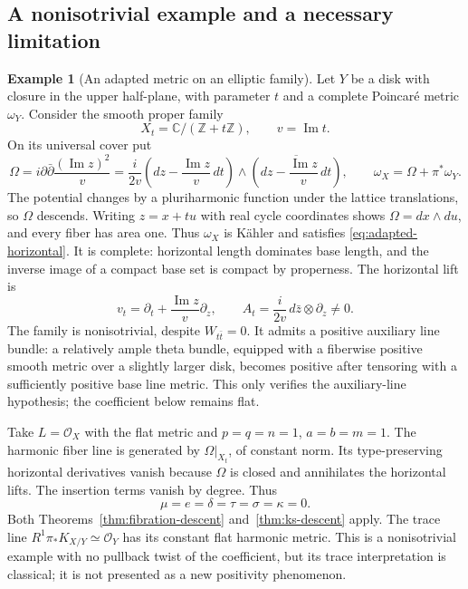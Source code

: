 \documentclass[11pt,reqno]{amsart}
\numberwithin{equation}{section}
\theoremstyle{definition}
\newtheorem{example}[theorem]{Example}
\theoremstyle{remark}
\newcommand{\ddbar}{\partial\bar\partial}
\newcommand{\C}{\mathbb C}
\newcommand{\cO}{\mathcal O}
\begin{document}
\subsection{A nonisotrivial example and a necessary limitation}
\begin{example}[An adapted metric on an elliptic family]\label{ex:elliptic-fibration}
Let $Y$ be a disk with closure in the upper half-plane, with parameter $t$ and a complete Poincar\'e metric $\omega_Y$. Consider the smooth proper family
\[
 X_t=\C/(\mathbb Z+t\mathbb Z),\qquad v=\operatorname{Im}t.
\]
On its universal cover put
\begin{equation}\label{eq:elliptic-adapted-metric}
 \Omega=i\ddbar\frac{(\operatorname{Im}z)^2}{v}
   =\frac{i}{2v}\left(dz-\frac{\operatorname{Im}z}{v}\,dt\right)
             \wedge\overline{\left(dz-\frac{\operatorname{Im}z}{v}\,dt\right)},
 \qquad \omega_X=\Omega+\pi^*\omega_Y.
\end{equation}
The potential changes by a pluriharmonic function under the lattice translations, so $\Omega$ descends. Writing $z=x+tu$ with real cycle coordinates shows $\Omega=dx\wedge du$, and every fiber has area one. Thus $\omega_X$ is K\"ahler and satisfies \eqref{eq:adapted-horizontal}. It is complete: horizontal length dominates base length, and the inverse image of a compact base set is compact by properness. The horizontal lift is
\[
 v_t=\partial_t+\frac{\operatorname{Im}z}{v}\partial_z,
 \qquad A_t=\frac{i}{2v}\,d\bar z\otimes\partial_z\ne0.
\]
The family is nonisotrivial, despite $W_{t\bar t}=0$. It admits a positive auxiliary line bundle: a relatively ample theta bundle, equipped with a fiberwise positive smooth metric over a slightly larger disk, becomes positive after tensoring with a sufficiently positive base line metric. This only verifies the auxiliary-line hypothesis; the coefficient below remains flat.

Take $L=\cO_X$ with the flat metric and $p=q=n=1$, $a=b=m=1$. The harmonic fiber line is generated by $\Omega|_{X_t}$, of constant norm. Its type-preserving horizontal derivatives vanish because $\Omega$ is closed and annihilates the horizontal lifts. The insertion terms vanish by degree. Thus
\[
 \mu=e=\delta=\tau=\sigma=\kappa=0.
\]
Both Theorems~\ref{thm:fibration-descent} and~\ref{thm:ks-descent} apply. The trace line $R^1\pi_*K_{X/Y}\simeq\cO_Y$ has its constant flat harmonic metric. This is a nonisotrivial example with no pullback twist of the coefficient, but its trace interpretation is classical; it is not presented as a new positivity phenomenon.


\end{example}
\end{document}
